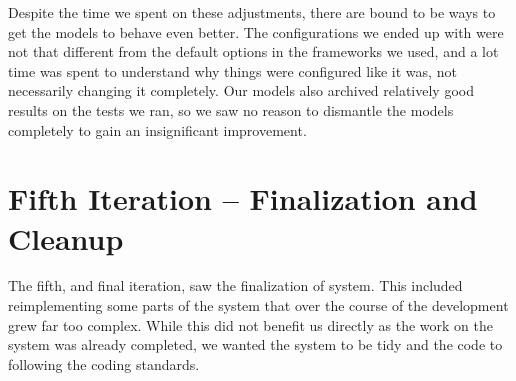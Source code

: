 Despite the time we spent on these adjustments, there are bound to be ways to get the models to behave even better. The configurations we ended up with were not that different from the default options in the frameworks we used, and a lot time was spent to understand why things were configured like it was, not necessarily changing it completely. Our models also archived relatively good results on the tests we ran, so we saw no reason to dismantle the models completely to gain an insignificant improvement.


\section{Fifth Iteration -- Finalization and Cleanup}
The fifth, and final iteration, saw the finalization of system. This included reimplementing some parts of the system that over the course of the development grew far too complex. While this did not benefit us directly as the work on the system was already completed, we wanted the system to be tidy and the code to following the coding standards.